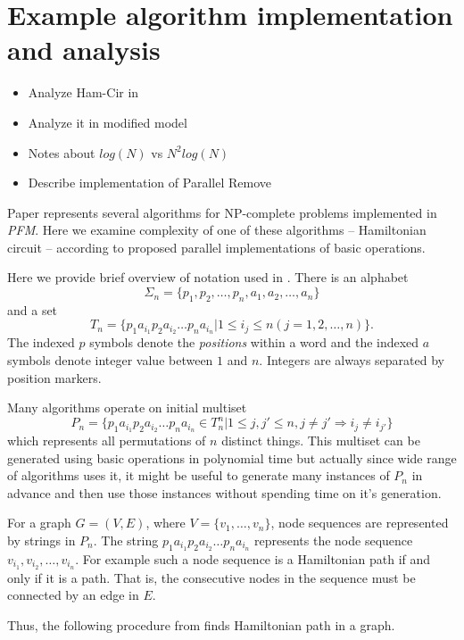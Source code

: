 \section{Example algorithm implementation and analysis} \label{algo}
\begin{itemize}
	\item Analyze Ham-Cir in \cite{Katsanyi:2003}
	\item Analyze it in modified model
	\item Notes about $log(N)$ vs $N^2 log(N)$
	\item Describe implementation of Parallel Remove
\end{itemize}

Paper \cite{Katsanyi:2003} represents several algorithms for NP-complete problems implemented in \emph{PFM}. Here we examine complexity of one of these algorithms -- Hamiltonian circuit -- according to proposed parallel implementations of basic operations.

Here we provide brief overview of notation used in \cite{Katsanyi:2003}. There is an alphabet
$$\Sigma_n = \{p_1, p_2, \dots, p_n, a_1, a_2, \dots, a_n\}$$
and a set
$$T_n = \{p_1 a_{i_1} p_2 a_{i_2} \dots p_n a_{i_n} |
1 \leq i_j \leq n (j = 1, 2, \dots, n)\}.$$
The indexed $p$ symbols denote the \emph{positions} within a word and the indexed $a$ symbols denote integer value between $1$ and $n$. Integers are always separated by position markers.

Many algorithms operate on initial multiset 
$$P_n=\{p_1 a_{i_1} p_2 a_{i_2} \dots p_n a_{i_n} \in T^n_n | 
         1 \leq j, j' \leq n, j \neq j' \Rightarrow i_j \neq i_{j'}\}$$ 
which represents all permutations of $n$ distinct things. This multiset can be generated using basic operations in polynomial time \cite{Amos:1996} but actually since wide range of algorithms uses it, it might be useful to generate many instances of $P_n$ in advance and then use those instances without spending time on it's generation.

For a graph $G=(V, E)$, where $V=\{v_1, \dots, v_n\}$, node sequences are represented by strings in $P_n$. The string $p_1 a_{i_1} p_2 a_{i_2} \dots p_n a_{i_n}$ represents the node sequence $v_{i_1}, v_{i_2}, \dots, v_{i_n}$. For example such a node sequence is a Hamiltonian path if and only if it is a path. That is, the consecutive nodes in the sequence must be connected by an edge in $E$.

Thus, the following procedure from \cite{Amos:1996} finds Hamiltonian path in a graph.

